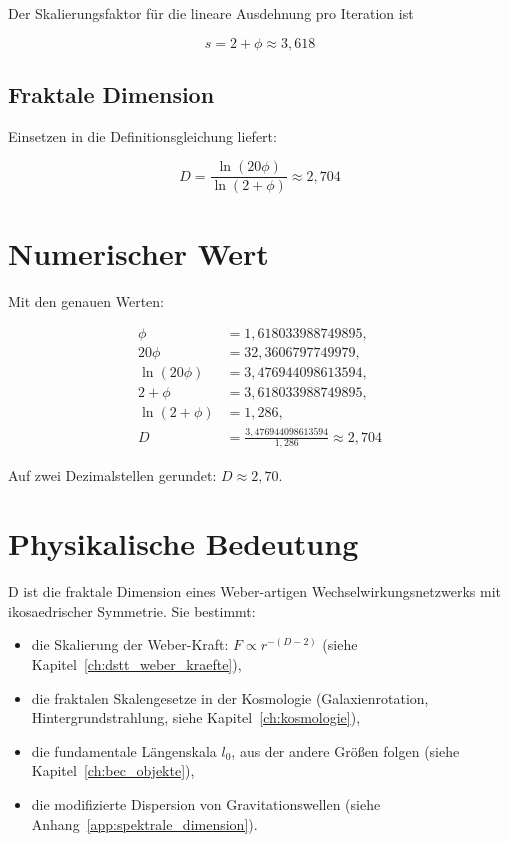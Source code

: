 Der Skalierungsfaktor für die lineare Ausdehnung pro Iteration ist

\[
s = 2 + \phi \approx 3,618
\]

\subsection{Fraktale Dimension}
\label{sub:d_formel}

Einsetzen in die Definitionsgleichung liefert:

\[
D = \frac{\ln(20\phi)}{\ln(2 + \phi)} \approx 2,704
\]

\section{Numerischer Wert}
\label{sec:d_numerisch}

Mit den genauen Werten:

\begin{align*}
\phi &= 1,618033988749895, \\
20\phi &= 32,3606797749979, \\
\ln(20\phi) &= 3,476944098613594, \\
2 + \phi &= 3,618033988749895, \\
\ln(2 + \phi) &= 1,286, \\
D &= \frac{3,476944098613594}{1,286} \approx 2,704
\end{align*}

Auf zwei Dezimalstellen gerundet: \( D \approx 2,70 \).

\section{Physikalische Bedeutung}
\label{sec:d_bedeutung}

D ist die fraktale Dimension eines Weber-artigen Wechselwirkungsnetzwerks mit ikosaedrischer Symmetrie. Sie bestimmt:

\begin{itemize}
    \item die Skalierung der Weber-Kraft: \( F \propto r^{-(D-2)} \) (siehe Kapitel~\ref{ch:dstt_weber_kraefte}),
    \item die fraktalen Skalengesetze in der Kosmologie (Galaxienrotation, Hintergrundstrahlung, siehe Kapitel~\ref{ch:kosmologie}),
    \item die fundamentale Längenskala \( l_0 \), aus der andere Größen folgen (siehe Kapitel~\ref{ch:bec_objekte}),
    \item die modifizierte Dispersion von Gravitationswellen (siehe Anhang~\ref{app:spektrale_dimension}).
\end{itemize}

